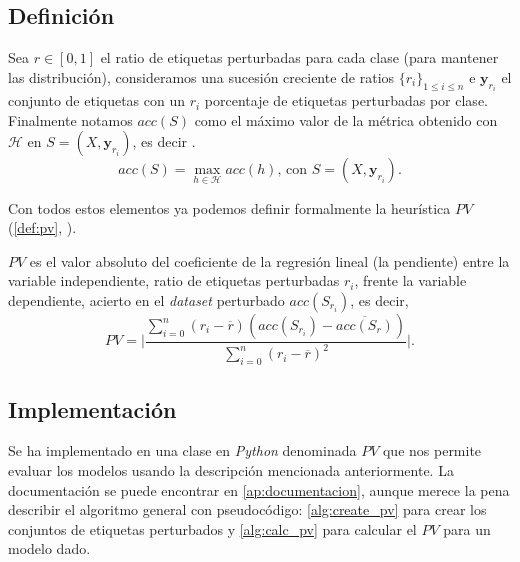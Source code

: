 \subsection{Definición}

Sea $r \in [0, 1]$ el ratio de etiquetas perturbadas para cada clase (para mantener las distribución), consideramos una sucesión creciente de ratios $\{r_i\}_{1 \leq i \leq n}$ e $\textbf{y}_{r_i}$ el conjunto de etiquetas con un $r_i$ porcentaje de etiquetas perturbadas por clase. Finalmente notamos $acc(S)$ como el máximo valor de la métrica obtenido con $\mathcal{H}$ en $S = (X, \textbf{y}_{r_i})$, es decir \cite{zhang2019perturbation}.
\begin{equation*}
  acc(S) = \max_{h \in \mathcal{H}} acc(h) \text{, con } S = (X, \textbf{y}_{r_i}).
  \label{eq:acc_rel}
\end{equation*}

Con todos estos elementos ya podemos definir formalmente la heurística $PV$ (\autoref{def:pv}, \cite{zhang2019perturbation}).

\begin{definicion}\label{def:pv}
  $PV$ es el valor absoluto del coeficiente de la regresión lineal (la pendiente) entre la variable independiente, ratio de etiquetas perturbadas $r_i$, frente la variable dependiente, acierto en el \emph{dataset} perturbado $acc(S_{r_i})$, es decir,
  $$PV = \Bigg|\dfrac{\sum \limits^n_{i = 0} (r_i - \overline{r})(acc(S_{r_{i}}) - \overline{acc(S_r)})}{\sum \limits^n_{i = 0}(r_i - \overline{r})^2}\Bigg|.$$
\end{definicion}

\subsection{Implementación}

Se ha implementado en una clase en \emph{Python} denominada \textbf{$PV$} que nos permite evaluar los modelos usando la descripción mencionada anteriormente. La documentación se puede encontrar en \autoref{ap:documentacion}, aunque merece la pena describir el algoritmo general con pseudocódigo: \autoref{alg:create_pv} para crear los conjuntos de etiquetas perturbados y \autoref{alg:calc_pv} para calcular el $PV$ para un modelo dado.

